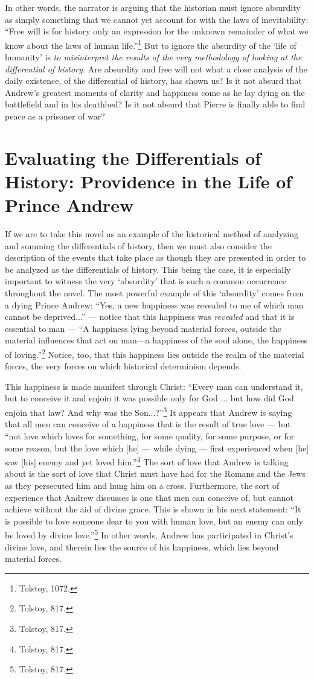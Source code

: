 \documentclass[12pt]{article}
\begin{document}
In other words, the narrator is arguing that the historian must ignore absurdity as simply something that we cannot yet account for with the laws of inevitability: ``Free will is for history only an expression for the unknown remainder of what we know about the laws of human life.''\footnote{Tolstoy, 1072.} But to ignore the absurdity of the `life of humanity' is \emph{to misinterpret the results of the very methodology of looking at the differential of history.} Are absurdity and free will not what a close analysis of the daily existence, of the differential of history, has shown us? Is it not absurd that Andrew's greatest moments of clarity and happiness come as he lay dying on the battlefield and in his deathbed? Is it not absurd that Pierre is finally able to find peace as a prisoner of war?

\section{Evaluating the Differentials of History: Providence in the Life of Prince Andrew}

If we are to take this novel as an example of the historical method of analyzing and summing the differentials of history, then we must also consider the description of the events that take place as though they are presented in order to be analyzed as the differentials of history. This being the case, it is especially important to witness the very `absurdity' that is such a common occurrence throughout the novel. The most powerful example of this `absurdity' comes from a dying Prince Andrew: ``Yes, a new happiness was revealed to me of which man cannot be deprived...'' --- notice that this happiness was \emph{revealed} and that it is essential to man --- ``A happiness lying beyond material forces, outside the material influences that act on man---a happiness of the soul alone, the happiness of loving.''\footnote{Tolstoy, 817.} Notice, too, that this happiness lies outside the realm of the material forces, the very forces on which historical determinism depends.

This happiness is made manifest through Christ: ``Every man can understand it, but to conceive it and enjoin it was possible only for God ... but how did God enjoin that law? And why was the Son...?''\footnote{Tolstoy, 817.} It appears that Andrew is saying that all men can conceive of a happiness that is the result of true love --- but ``not love which loves for something, for some quality, for some purpose, or for some reason, but the love which [he] --- while dying --- first experienced when [he] saw [his] enemy and yet loved him.''\footnote{Tolstoy, 817.} The sort of love that Andrew is talking about is the sort of love that Christ must have had for the Romans and the Jews as they persecuted him and hung him on a cross. Furthermore, the sort of experience that Andrew discusses is one that men can conceive of, but cannot achieve without the aid of divine grace. This is shown in his next statement: ``It is possible to love someone dear to you with human love, but an enemy can only be loved by divine love.''\footnote{Tolstoy, 817.} In other words, Andrew has participated in Christ's divine love, and therein lies the source of his happiness, which lies beyond material forces.
\end{document}
